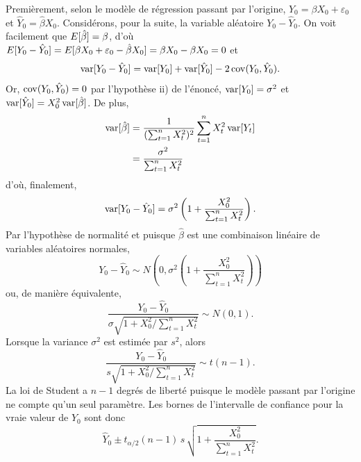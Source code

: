 \begin{solution}{2.15}
    Premièrement, selon le modèle de régression passant par l'origine,
    $Y_0 = \beta X_0 + \varepsilon_0$ et $\hat{Y}_0 = \hat{\beta}
    X_0$. Considérons, pour la suite, la variable aléatoire $Y_0 -
    \hat{Y}_0$. On voit facilement que $E [ \hat{\beta} ] = \beta$,
    d'où $E [ Y_0 - \hat{Y}_0 ] = E [ \beta X_0 + \varepsilon_0 -
      \hat{\beta} X_0 ] = \beta X_0 - \beta X_0 = 0$ et
    \begin{displaymath}
      \mathrm{var} [ Y_0 - \hat{Y}_0 ] = \mathrm{var} [ Y_0 ] + \mathrm{var} [ \hat{Y}_0 ] - 2\,
      \mathrm{cov}(Y_0, \hat{Y}_0).
    \end{displaymath}
    Or, $\mathrm{cov}(Y_0, \hat{Y}_0) = 0$ par l'hypothèse ii) de l'énoncé,
    $\mathrm{var} [ Y_0 ] = \sigma^2$ et $\mathrm{var} [ \hat{Y}_0 ] = X_0^2\,
    \mathrm{var} [ \hat{\beta} ]$. De plus,
    \begin{align*}
      \mathrm{var} [ \hat{\beta} ]
      &= \frac{1}{(\sum_{t=1}^n X_t^2)^2} \sum_{t=1}^n X_t^2\,
      \mathrm{var} [ Y_t ] \\
      &= \frac{\sigma^2}{\sum_{t=1}^n X_t^2}
    \end{align*}
    d'où, finalement,
    \begin{displaymath}
      \mathrm{var} [ Y_0 - \hat{Y}_0 ] =
      \sigma^2 \left( 1 + \frac{X_0^2}{\sum_{t=1}^n X_t^2} \right).
    \end{displaymath}
    Par l'hypothèse de normalité et puisque $\hat{\beta}$ est une
    combinaison linéaire de variables aléatoires normales,
    \begin{displaymath}
      Y_0 - \hat{Y}_0 \sim N
      \left(
        0, \sigma^2 \left( 1 + \frac{X_0^2}{\sum_{t=1}^n X_t^2} \right)
      \right)
    \end{displaymath}
    ou, de manière équivalente,
    \begin{displaymath}
      \frac{Y_0 - \hat{Y}_0}{\sigma \sqrt{1 + X_0^2/\sum_{t=1}^n X_t^2}}
      \sim N(0, 1).
    \end{displaymath}
    Lorsque la variance $\sigma^2$ est estimée par $s^2$, alors
    \begin{displaymath}
      \frac{Y_0 - \hat{Y}_0}{s \sqrt{1 + X_0^2/\sum_{t=1}^n X_t^2}}
      \sim t(n - 1).
    \end{displaymath}
    La loi de Student a $n - 1$ degrés de liberté puisque le modèle
    passant par l'origine ne compte qu'un seul paramètre. Les bornes
    de l'intervalle de confiance pour la vraie valeur de $Y_0$ sont
    donc
    \begin{displaymath}
      \hat{Y}_0 \pm t_{\alpha/2}(n - 1)\, s\, \sqrt{1 +
        \frac{X_0^2}{\sum_{t=1}^n X_t^2}}.
    \end{displaymath}
  
\end{solution}
